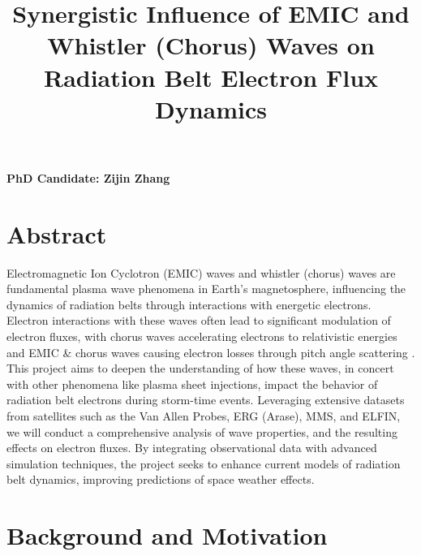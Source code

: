 \documentclass[
  letterpaper,
  DIV=11,
  numbers=noendperiod]{scrartcl}
\title{Synergistic Influence of EMIC and Whistler (Chorus) Waves on Radiation Belt Electron Flux Dynamics}
\author{}
\date{}
\begin{document}
\maketitle

\vspace{-20truemm}

\textbf{PhD Candidate: Zijin Zhang}

\section{Abstract}\label{abstract}

Electromagnetic Ion Cyclotron (EMIC) waves and whistler (chorus) waves are fundamental plasma wave phenomena in Earth's magnetosphere, influencing the dynamics of radiation belts through interactions with energetic electrons. Electron interactions with these waves often lead to significant modulation of electron fluxes, with chorus waves accelerating electrons to relativistic energies \citep{miyoshiRebuildingProcessOuter2003} and EMIC \& chorus waves causing electron losses through pitch angle scattering \citep{summersRelativisticElectronPitchangle2003, summersTimescalesRadiationBelt2007}. This project aims to deepen the understanding of how these waves, in concert with other phenomena like plasma sheet injections, impact the behavior of radiation belt electrons during storm-time events. Leveraging extensive datasets from satellites such as the Van Allen Probes, ERG (Arase), MMS, and ELFIN, we will conduct a comprehensive analysis of wave properties, and the resulting effects on electron fluxes. By integrating observational data with advanced simulation techniques, the project seeks to enhance current models of radiation belt dynamics, improving predictions of space weather effects.

\section{Background and Motivation}\label{background-and-motivation}
\end{document}
